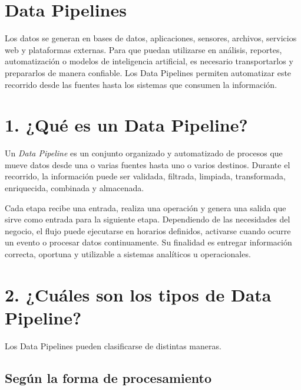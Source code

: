 \section*{Data Pipelines}

Los datos se generan en bases de datos, aplicaciones, sensores, archivos,
servicios web y plataformas externas. Para que puedan utilizarse en análisis,
reportes, automatización o modelos de inteligencia artificial, es necesario
transportarlos y prepararlos de manera confiable. Los Data Pipelines permiten
automatizar este recorrido desde las fuentes hasta los sistemas que consumen la
información.

\section*{1. ¿Qué es un Data Pipeline?}

Un \textit{Data Pipeline} es un conjunto organizado y automatizado de procesos
que mueve datos desde una o varias fuentes hasta uno o varios destinos. Durante
el recorrido, la información puede ser validada, filtrada, limpiada,
transformada, enriquecida, combinada y almacenada.

Cada etapa recibe una entrada, realiza una operación y genera una salida que
sirve como entrada para la siguiente etapa. Dependiendo de las necesidades del
negocio, el flujo puede ejecutarse en horarios definidos, activarse cuando
ocurre un evento o procesar datos continuamente. Su finalidad es entregar
información correcta, oportuna y utilizable a sistemas analíticos u
operacionales.

\section*{2. ¿Cuáles son los tipos de Data Pipeline?}

Los Data Pipelines pueden clasificarse de distintas maneras.

\subsection*{Según la forma de procesamiento}


